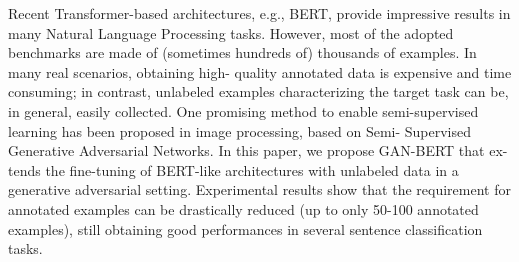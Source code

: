 Recent Transformer-based architectures, e.g., BERT, provide impressive results in many Natural Language Processing tasks. However, most of the adopted benchmarks are made of (sometimes hundreds of) thousands of examples. In many real scenarios, obtaining high- quality annotated data is expensive and time consuming; in contrast, unlabeled examples characterizing the target task can be, in general, easily collected. One promising method to enable semi-supervised learning has been proposed in image processing, based on Semi- Supervised Generative Adversarial Networks. In this paper, we propose GAN-BERT that ex- tends the fine-tuning of BERT-like architectures with unlabeled data in a generative adversarial setting. Experimental results show that the requirement for annotated examples can be drastically reduced (up to only 50-100 annotated examples), still obtaining good performances in several sentence classification tasks.

